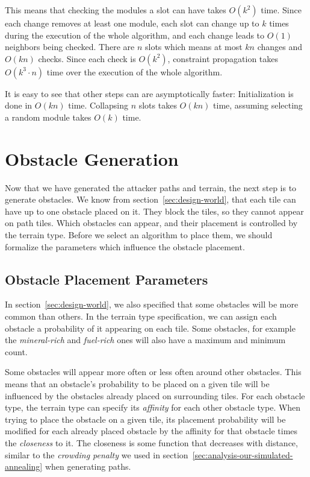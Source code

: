 This means that checking the modules a slot can have takes $O(k^2)$ time.
Since each change removes at least one module, each slot can change up to $k$ times during the execution of the whole algorithm, and each change leads to $O(1)$ neighbors being checked.
There are $n$ slots which means at most $kn$ changes and $O(kn)$ checks.
Since each check is $O(k^2)$, constraint propagation takes $O(k^3 \cdot n)$ time over the execution of the whole algorithm.

It is easy to see that other steps can are asymptotically faster:
Initialization is done in $O(kn)$ time.
Collapsing $n$ slots takes $O(kn)$ time, assuming selecting a random module takes $O(k)$ time.

\section{Obstacle Generation}\label{sec:analysis-obstacles}

Now that we have generated the attacker paths and terrain, the next step is to generate obstacles.
We know from section~\ref{sec:design-world}, that each tile can have up to one obstacle placed on it.
They block the tiles, so they cannot appear on path tiles.
Which obstacles can appear, and their placement is controlled by the terrain type.
Before we select an algorithm to place them, we should formalize the parameters which influence the obstacle placement.

\subsection{Obstacle Placement Parameters}

In section~\ref{sec:design-world}, we also specified that some obstacles will be more common than others.
In the terrain type specification, we can assign each obstacle a probability of it appearing on each tile.
Some obstacles, for example the \emph{mineral-rich} and \emph{fuel-rich} ones will also have a maximum and minimum count.

Some obstacles will appear more often or less often around other obstacles.
This means that an obstacle's probability to be placed on a given tile will be influenced by the obstacles already placed on surrounding tiles.
For each obstacle type, the terrain type can specify its \emph{affinity} for each other obstacle type.
When trying to place the obstacle on a given tile, its placement probability will be modified for each already placed obstacle by the affinity for that obstacle times the \emph{closeness} to it.
The closeness is some function that decreases with distance, similar to the \emph{crowding penalty} we used in section~\ref{sec:analysis-our-simulated-annealing} when generating paths.

